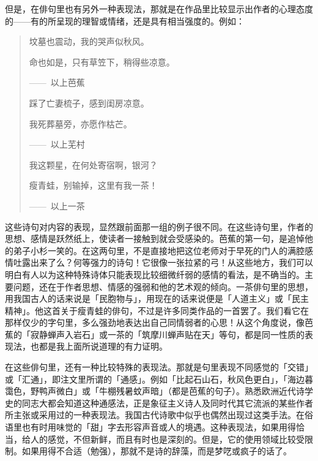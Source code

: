 {    但是，在俳句里也有另外一种表现法，那就是在作品里比较显示出作者的心理态度的——有的所呈现的理智或情绪，还是具有相当强度的。例如：
    \begin{quote}
        坟墓也震动，我的哭声似秋风。

        命也如是，只有草笠下，稍得些凉意。

        \hfill ——~以上芭蕉

        踩了亡妻梳子，感到闺房凉意。

        我死葬墓旁，亦愿作枯芒。

        \hfill ——~以上芜村

        我这颗星，在何处寄宿啊，银河？

        瘦青蛙，别输掉，这里有我一茶！

        \hfill ——~以上一茶
    \end{quote}

    这些诗句对内容的表现，显然跟前面那一组的例子很不同。在这些诗句里，作者的思想、感情是跃然纸上，使读者一接触到就会受感染的。芭蕉的第一句，是追悼他的弟子小杉一笑的。在这两句里，不是直接地把这位老师对于早死的门人的满腔感情吐露出来了么？何等强力的诗句！它很像一张拉紧的弓！从这些地方，我们可以明白有人以为这种特殊诗体只能表现比较细微纤弱的感情的看法，是不确当的。主要问题，还在于作者思想、情感的强弱和他的艺术观的倾向。一茶俳句里的思想，用我国古人的话来说是「民胞物与」，用现在的话来说便是「人道主义」或「民主精神」。他这首关于瘦青蛙的俳句，不过是许多同类作品的一首罢了。我们看它在那样仅少的字句里，多么强劲地表达出自己同情弱者的心思！从这个角度说，像芭蕉的「寂静蝉声入岩石」或一茶的「筑摩川蝉声贴在天」等句，都是同一性质的表现法，也都是我上面所说道理的有力证明。

    在这些俳句里，还有一种比较特殊的表现法。那就是句里表现不同感觉的「交错」或「汇通」，即注文里所谓的「通感」。例如「比起石山石，秋风色更白」，「海边暮霭色，野鸭声微白」或「牛棚残暑蚊声暗」（都是芭蕉的句子）。熟悉欧洲近代诗学史的同志大都会知道这种通感法，正是象征主义诗人及同时代其它流派的某些作者所主张或采用过的一种表现法。我国古代诗歌中似乎也偶然出现过这类手法。在俗语里也有时用味觉的「甜」字去形容声音或人的境遇。这种表现法，如果用得恰当，给人的感觉，不但新鲜，而且有时也是深刻的。但是，它的使用领域比较受限制。如果用得不合适（勉强），那就不是诗的辞藻，而是梦呓或疯子的话了。

}
